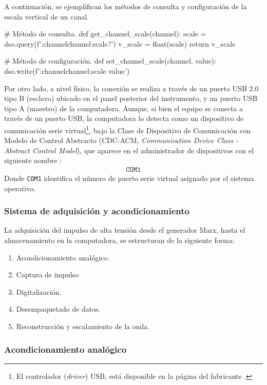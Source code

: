 A continuación, se ejemplifican los métodos de consulta y configuración de la escala vertical de un canal.
\begin{python}
# Método de consulta.
def get_channel_scale(channel):
    scale = dso.query(f':channel{channel}:scale?')
    v_scale = float(scale)
    return v_scale

# Método de configuración.
def set_channel_scale(channel, value):
    dso.write(f':channel{channel}:scale {value}')
\end{python}

Por otro lado, a nivel físico, la conexión se realiza a través de un puerto USB 2.0 tipo B (esclavo) ubicado en el panel posterior del instrumento, y un puerto USB tipo A (maestro) de la computadora. Aunque, si bien el equipo se conecta a través de un puerto USB, la computadora lo detecta como un dispositivo de comunicación serie virtual\footnote{El controlador (\emph{driver}) USB, está disponible en la página del fabricante \cite{gds1000au_driver}.}, bajo la Clase de Dispositivo de Comunicación con Modelo de Control Abstracto (CDC-ACM, \emph{Communication Device Class - Abstract Control Model}), que aparece en el administrador de dispositivos con el siguiente nombre \cite{gds1000au_ProgrammingManual}:
\begin{align*}
    \texttt{COM1}
\end{align*}
Donde \texttt{COM1} identifica el número de puerto serie virtual asignado por el sistema operativo.

\subsubsection{Sistema de adquisición y acondicionamiento}
\label{subsubsec:arquitectura_flujo}

La adquisición del impulso de alta tensión desde el generador Marx, hasta el almacenamiento en la computadora, se estructuran de la siguiente forma:

\begin{enumerate}
    \item Acondicionamiento analógico.
    \item Captura de impulso
    \item Digitalización.
    \item Desempaquetado de datos.
    \item Reconstrucción y escalamiento de la onda.
\end{enumerate}

\subsubsection{Acondicionamiento analógico}

